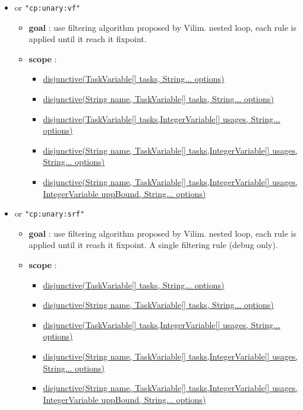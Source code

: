 \begin{itemize}
		\item \label{cdisjunctivedf:cdisjunctivevfoptions}\hypertarget{cdisjunctivevf:cdisjunctivevfoptions}{}				
		 or \texttt{"cp:unary:vf"}
		\begin{itemize}
				\item \textbf{goal} : use filtering algorithm proposed by Vilim. nested loop, each rule is applied until it reach it fixpoint.
				\item \textbf{scope} : 
					\begin{itemize}
						\item \hyperlink{disjunctive:disjunctiveconstraint}{disjunctive(TaskVariable[] tasks, String... options) }
						\item \hyperlink{disjunctive:disjunctiveconstraint}{disjunctive(String name, TaskVariable[] tasks, String... options)}													\item \hyperlink{disjunctive:disjunctiveconstraint}{disjunctive(TaskVariable[] tasks,IntegerVariable[] usages, String... options)}
						\item \hyperlink{disjunctive:disjunctiveconstraint}{disjunctive(String name, TaskVariable[] tasks,IntegerVariable[] usages, String... options)}							
						\item \hyperlink{disjunctive:disjunctiveconstraint}{disjunctive(String name, TaskVariable[] tasks,IntegerVariable[] usages, IntegerVariable uppBound, String... options)}
					\end{itemize}
		\end{itemize}
		
		\item \label{cdisjunctivesrf:cdisjunctivesrfoptions}\hypertarget{cdisjunctivesrf:cdisjunctivesrfoptions}{}				
		 or \texttt{"cp:unary:srf"}
		\begin{itemize}
				\item \textbf{goal} : use filtering algorithm proposed by Vilim. nested loop, each rule is applied until it reach it fixpoint. A single filtering rule (debug only).
				\item \textbf{scope} : 
					\begin{itemize}
						\item \hyperlink{disjunctive:disjunctiveconstraint}{disjunctive(TaskVariable[] tasks, String... options) }
						\item \hyperlink{disjunctive:disjunctiveconstraint}{disjunctive(String name, TaskVariable[] tasks, String... options)}													\item \hyperlink{disjunctive:disjunctiveconstraint}{disjunctive(TaskVariable[] tasks,IntegerVariable[] usages, String... options)}
						\item \hyperlink{disjunctive:disjunctiveconstraint}{disjunctive(String name, TaskVariable[] tasks,IntegerVariable[] usages, String... options)}							
						\item \hyperlink{disjunctive:disjunctiveconstraint}{disjunctive(String name, TaskVariable[] tasks,IntegerVariable[] usages, IntegerVariable uppBound, String... options)}
					\end{itemize}
		\end{itemize}		


\end{itemize}
